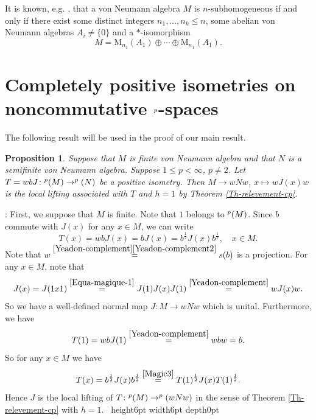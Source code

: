 \documentclass[leqno]{article} %
\let\L\relax
\newcommand{\L}{\mathrm{L}}
\newcommand{\M}{\mathrm{M}}
\renewcommand{\leq}{\ensuremath{\leqslant}}
\newcommand{\qed}{\hfill \vrule height6pt  width6pt depth0pt}
\newcommand{\co}{\colon}
\newcommand{\ov}{\overset}
\newtheorem{prop}[thm]{Proposition}
\newenvironment{proof}[1][]{\noindent {\it Proof #1} : }{\hbox{~}\qed
\smallskip
}
\numberwithin{equation}{section}
\begin{document}
It is known, e.g. \cite[Lemma 2.4]{ShU1}, that a von Neumann algebra $M$ is $n$-subhomogeneous if and only if there exist some distinct integers $n_1,\ldots,n_k \leq n$,  some abelian von Neumann algebras $A_i \not=\{0\}$ and a $*$-isomorphism 
\begin{equation}
\label{AVN-subh}
M
=\M_{n_1}(A_1) \oplus \cdots \oplus \M_{n_1}(A_1).
\end{equation} 


\section{Completely positive isometries on noncommutative $\L^p$-spaces}
\label{Sec-2_isometries}


The following result will be used in the proof of our main result.

\begin{prop}
\label{Prop-Local-lifting}
Suppose that $M$ is finite von Neumann algebra and that $N$ is a semifinite von Neumann algebra. Suppose $1 \leq p < \infty$, $p \not=2$. Let $T=wbJ \co \L^p(M) \to \L^p(N)$ be a positive isometry. Then $M \to wNw$, $x \mapsto wJ(x)w$ is the local lifting associated with $T$ and $h=1$ by Theorem \ref{Th-relevement-cp}.
\end{prop}

\begin{proof} 
First, we suppose that $M$ is finite. Note that $1$ belongs to $\L^p(M)$. Since $b$ commute with $J(x)$ for any $x \in M$, we can write
$$
T(x)
=wbJ(x)
=bJ(x)
=b^{\frac{1}{2}}J(x)b^{\frac{1}{2}}, \quad x \in M.
$$ 
Note that $w \ov{\eqref{Yeadon-complement}\eqref{Yeadon-complement2}}{=} s(b)$ is a projection.  
For any $x \in M$, note that
$$
J(x)
=J(1x1)
\ov{\eqref{Equa-magique-1}}{=} J(1)J(x)J(1)
\ov{\eqref{Yeadon-complement}}{=} wJ(x)w.
$$
So we have a well-defined normal map $J \co M \to wNw$ which is unital. Furthermore, we have
\begin{equation}
\label{Magic3}
T(1)
=wbJ(1)
\ov{\eqref{Yeadon-complement}}{=} wbw
=b.
\end{equation}
So for any $x \in M$ we have
$$
T(x)
=b^{\frac{1}{2}}J(x)b^{\frac{1}{2}}
\ov{\eqref{Magic3}}{=} T(1)^{\frac{1}{2}}J(x)T(1)^{\frac{1}{2}}.
$$
Hence $J$ is the local lifting of $T \co \L^p(M) \to \L^p(wNw)$ in the sense of Theorem \ref{Th-relevement-cp} with $h=1$. 
\end{proof}
\end{document}
